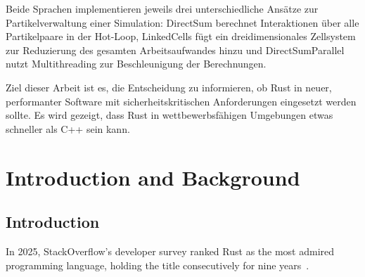 \documentclass[11pt,
               a4paper,
               bibtotoc,
               idxtotoc,
               headsepline,
               footsepline,
               footexclude,
               BCOR12mm,
               DIV13,
               openany,   %
               ]
               {scrbook}
\begin{document}
Beide Sprachen implementieren jeweils drei unterschiedliche Ansätze zur Partikelverwaltung einer Simulation: DirectSum berechnet Interaktionen über alle Partikelpaare in der Hot-Loop, LinkedCells fügt ein dreidimensionales Zellsystem zur Reduzierung des gesamten Arbeitsaufwandes hinzu und DirectSumParallel nutzt Multithreading zur Beschleunigung der Berechnungen.

Ziel dieser Arbeit ist es, die Entscheidung zu informieren, ob Rust in neuer, performanter Software mit sicherheitskritischen Anforderungen eingesetzt werden sollte. Es wird gezeigt, dass Rust in wettbewerbsfähigen Umgebungen etwas schneller als C++ sein kann.


\cleardoublepage


\tableofcontents
\thispagestyle{empty}
\cleardoubleemptypage


\mainmatter
\part{Introduction and Background}
\chapter{Introduction}
\label{sec:intro}

In 2025, StackOverflow's developer survey ranked Rust as the most admired programming language, holding the title consecutively for nine years~\cite{stackoverflow-developer-survey}.
\end{document}
